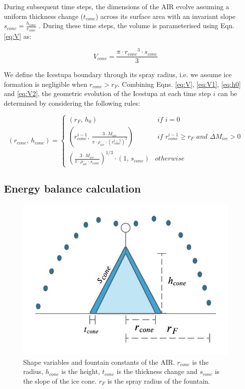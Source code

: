 \documentclass[utf8]{frontiersSCNS}
\begin{document}
During subsequent time steps, the dimensions of the AIR evolve assuming a uniform thickness change ($t_{cone}$)
across its surface area with an invariant slope $s_{cone} = \frac{h_{cone}}{r_{cone}}$ .  During these time
steps, the volume is parameterised using Eqn. \ref{eq:V} as:

\begin{equation} V_{cone} = \frac{\pi \cdot {r_{cone}}^3
		\cdot s_{cone}}{3} \label{eq:V2} \end{equation}

We define the Icestupa boundary through its spray radius, i.e. we assume ice formation is negligible when $r_{cone} >
	r_{F}$. Combining Eqns. \ref{eq:V},  \ref{eq:V1}, \ref{eq:h0} and \ref{eq:V2}, the geometric evolution of the
Icestupa at each time step $i$ can be determined by considering the following rules:

\begin{equation} (r_{cone},\, h_{cone}) = \left\{ \begin{array}{ll} (r_F ,\, h_0)                                                                          & \textit{ if } i=0 \\
             (r_{cone}^{i-1},\, \frac{3 \cdot M_{ice}}{\pi \cdot \rho_{ice} \cdot {(r_{cone}^{i-1})}^2}) & \textit{ if }
             r_{cone}^{i-1} \geq r_{F} \textit{ and } \Delta M_{ice} > 0                                                     \\ (\frac{3 \cdot M_{ice}}{\pi \cdot \rho_{ice} \cdot s_{cone}})^{1/3} \cdot (1,\,  s_{cone}) &
             otherwise\end{array} \right.  \label{eq:A2} \end{equation}



\subsection{Energy balance calculation} \label{sec:energy}

\begin{figure}
	\begin{center}
		\includegraphics[width=10 cm]{Figures/shape_parameters.jpeg}
	\end{center}
	\caption{Shape variables and fountain constants of the AIR. $r_{cone}$ is the radius, $h_{cone}$ is the
		height, $t_{cone}$ is the thickness change and $s_{cone}$ is the slope of the ice cone. $r_F$ is the spray
		radius of the fountain.}
	\label{fig:shape}
\end{figure}
\end{document}
